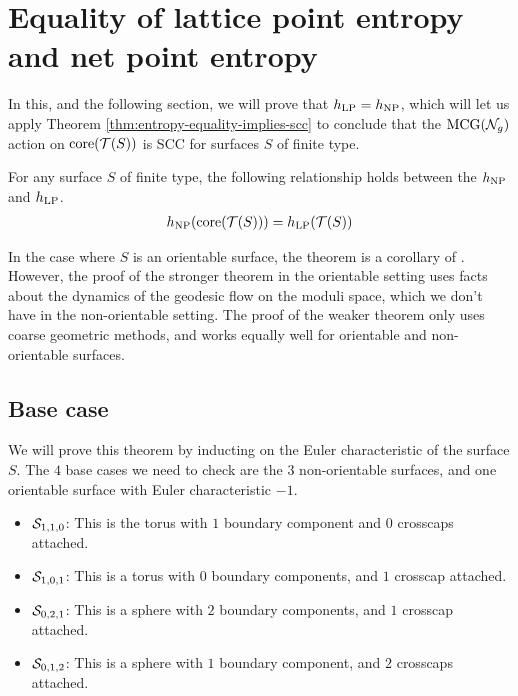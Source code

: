 \section{Equality of lattice point entropy and net point entropy}
\label{sec:equal-latt-point}


In this, and the following section, we will prove that $h_{\mathrm{LP}} = h_{\mathrm{NP}}$, which will let us apply Theorem \ref{thm:entropy-equality-implies-scc} to conclude that the $\mathrm{MCG}(\mathcal{N}_g)$ action on $\mathrm{core}(\mathcal{T}(S))$ is SCC for surfaces $S$ of finite type.
\begin{theorem}
  \label{thm:entropy-equality}
  For any surface $S$ of finite type, the following relationship holds between the $h_{\mathrm{NP}}$ and $h_{\mathrm{LP}}$.
  \begin{align*}
    h_{\mathrm{NP}}(\mathrm{core}(\mathcal{T}(S))) = h_{\mathrm{LP}}(\mathcal{T}(S))
  \end{align*}
\end{theorem}

\begin{remark}
  In the case where $S$ is an orientable surface, the theorem is a corollary of \textcite[Theorem 1.2]{10.1215/00127094-1548443}.
  However, the proof of the stronger theorem in the orientable setting uses facts about the dynamics of the geodesic flow on the moduli space, which we don't have in the non-orientable setting.
  The proof of the weaker theorem only uses coarse geometric methods, and works equally well for orientable and non-orientable surfaces.
\end{remark}

\subsection{Base case}
\label{sec:base-case}

We will prove this theorem by inducting on the Euler characteristic of the surface $S$.
The $4$ base cases we need to check are the $3$ non-orientable surfaces, and one orientable surface with Euler characteristic $-1$.
\begin{itemize}
\item $\mathcal{S}_{1,1,0}$: This is the torus with $1$ boundary component and $0$ crosscaps attached.
\item $\mathcal{S}_{1,0,1}$: This is a torus with $0$ boundary components, and $1$ crosscap attached.
\item $\mathcal{S}_{0,2,1}$: This is a sphere with $2$ boundary components, and $1$ crosscap attached.
\item $\mathcal{S}_{0,1,2}$: This is a sphere with $1$ boundary component, and $2$ crosscaps attached.
\end{itemize}

